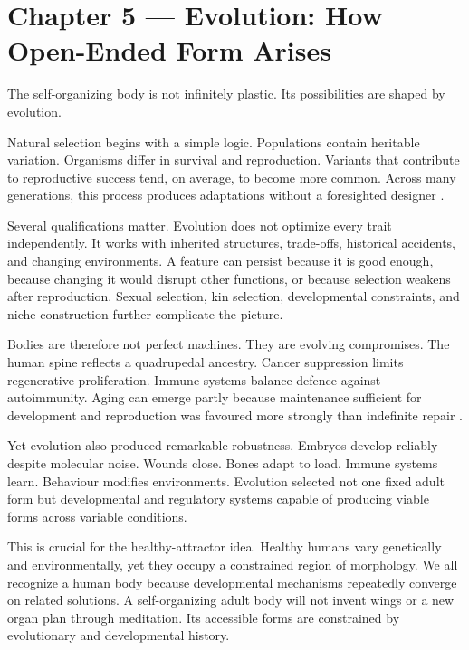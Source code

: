 \chapter{Chapter 5 --- Evolution: How Open-Ended Form Arises}\label{chapter-5-evolution-how-open-ended-form-arises}

The self-organizing body is not infinitely plastic. Its possibilities are shaped by evolution.

Natural selection begins with a simple logic. Populations contain heritable variation. Organisms differ in survival and reproduction. Variants that contribute to reproductive success tend, on average, to become more common. Across many generations, this process produces adaptations without a foresighted designer \autocite{darwin1859origin}.

Several qualifications matter. Evolution does not optimize every trait independently. It works with inherited structures, trade-offs, historical accidents, and changing environments. A feature can persist because it is good enough, because changing it would disrupt other functions, or because selection weakens after reproduction. Sexual selection, kin selection, developmental constraints, and niche construction further complicate the picture.

Bodies are therefore not perfect machines. They are evolving compromises. The human spine reflects a quadrupedal ancestry. Cancer suppression limits regenerative proliferation. Immune systems balance defence against autoimmunity. Aging can emerge partly because maintenance sufficient for development and reproduction was favoured more strongly than indefinite repair \autocite{kirkwood2005odd}.

Yet evolution also produced remarkable robustness. Embryos develop reliably despite molecular noise. Wounds close. Bones adapt to load. Immune systems learn. Behaviour modifies environments. Evolution selected not one fixed adult form but developmental and regulatory systems capable of producing viable forms across variable conditions.

This is crucial for the healthy-attractor idea. Healthy humans vary genetically and environmentally, yet they occupy a constrained region of morphology. We all recognize a human body because developmental mechanisms repeatedly converge on related solutions. A self-organizing adult body will not invent wings or a new organ plan through meditation. Its accessible forms are constrained by evolutionary and developmental history.

